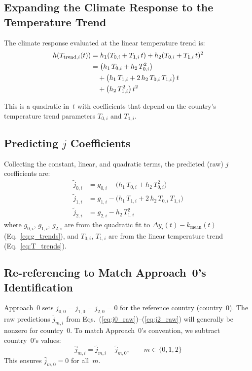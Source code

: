 \documentclass[11pt]{article}
\begin{document}
\subsection{Expanding the Climate Response to the Temperature Trend}

The climate response evaluated at the linear temperature trend is:
\begin{align}
h(T_{\mathrm{trend},i}(t)) &= h_1(T_{0,i} + T_{1,i}\,t) + h_2(T_{0,i} + T_{1,i}\,t)^2 \notag \\
&= \bigl(h_1\,T_{0,i} + h_2\,T_{0,i}^2\bigr) \notag \\
&\quad + \bigl(h_1\,T_{1,i} + 2\,h_2\,T_{0,i}\,T_{1,i}\bigr)\,t \notag \\
&\quad + \bigl(h_2\,T_{1,i}^2\bigr)\,t^2
\label{eq:h_trend_expanded}
\end{align}

This is a quadratic in~$t$ with coefficients that depend on the country's temperature
trend parameters $T_{0,i}$ and $T_{1,i}$.

\subsection{Predicting $j$ Coefficients}

Collecting the constant, linear, and quadratic terms, the predicted (raw) $j$ coefficients are:
\begin{align}
\tilde{j}_{0,i} &= g_{0,i} - \bigl(h_1\,T_{0,i} + h_2\,T_{0,i}^2\bigr) \label{eq:j0_raw} \\
\tilde{j}_{1,i} &= g_{1,i} - \bigl(h_1\,T_{1,i} + 2\,h_2\,T_{0,i}\,T_{1,i}\bigr) \label{eq:j1_raw} \\
\tilde{j}_{2,i} &= g_{2,i} - h_2\,T_{1,i}^2 \label{eq:j2_raw}
\end{align}
where $g_{0,i}$, $g_{1,i}$, $g_{2,i}$ are from the quadratic fit to
$\Delta y_i(t) - k_{\mathrm{mean}}(t)$ (Eq.~\ref{eq:g_trends}),
and $T_{0,i}$, $T_{1,i}$ are from the linear temperature trend (Eq.~\ref{eq:T_trends}).

\subsection{Re-referencing to Match Approach~0's Identification}

Approach~0 sets $j_{0,0} = j_{1,0} = j_{2,0} = 0$ for the reference country (country~0).
The raw predictions $\tilde{j}_{m,i}$ from Eqs.~(\ref{eq:j0_raw})--(\ref{eq:j2_raw})
will generally be nonzero for country~0. To match Approach~0's convention,
we subtract country~0's values:
\begin{equation}
\hat{j}_{m,i} = \tilde{j}_{m,i} - \tilde{j}_{m,0}, \qquad m \in \{0, 1, 2\}
\label{eq:j_reref}
\end{equation}
This ensures $\hat{j}_{m,0} = 0$ for all~$m$.
\end{document}
